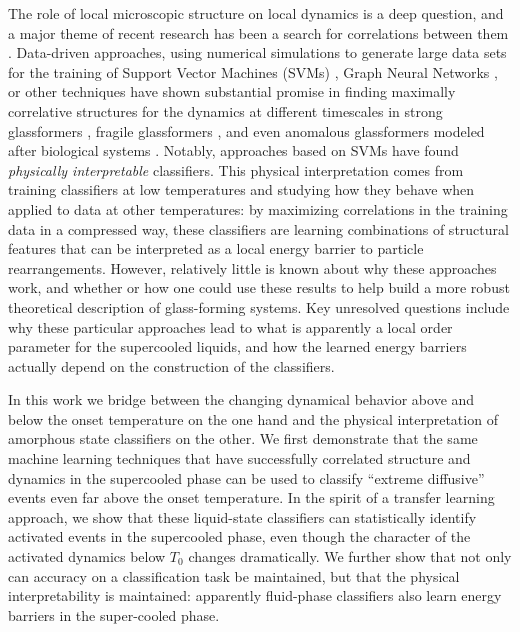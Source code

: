 \documentclass[aps,reprint,superscriptaddress,nofootinbib, notitlepage,prl]{revtex4-2}
\begin{document}
The role of local microscopic structure on local dynamics is a deep question, and a major theme of recent research has been a search for correlations between them \cite{berthier2007structure,kawasaki2007correlation, patrick2008direct,jack2014information,manning2011vibrational, widmer2008irreversible}. Data-driven approaches, using numerical simulations to generate large data sets for the training of Support Vector Machines (SVMs) \cite{cubuk2015identifying,schoenholz2016structural,sussman2017disconnecting}, Graph Neural Networks \cite{bapst2020unveiling}, or other techniques \cite{boattini2020autonomously,boattini2021averaging} have shown substantial promise in finding maximally correlative structures for the dynamics at different timescales in strong glassformers \cite{cubuk2020unifying}, fragile glassformers \cite{schoenholz2016structural,bapst2020unveiling,jung2022predicting}, and even anomalous glassformers modeled after biological systems \cite{tah2021quantifying}. Notably, approaches based on SVMs \cite{schoenholz2016structural} have found \emph{physically interpretable} classifiers. This physical interpretation comes from training classifiers at low temperatures and studying how they behave when applied to data at other temperatures: by maximizing correlations in the training data in a compressed way, these classifiers are learning combinations of structural features that can be interpreted as a local energy barrier to particle rearrangements. However, relatively little is known about why these approaches work, and whether or how one could use these results to help build a more robust theoretical description of glass-forming systems. Key unresolved questions include why these particular approaches lead to what is apparently a local order parameter for the supercooled liquids, and how the learned energy barriers actually depend on the construction of the classifiers.

In this work we bridge between the changing dynamical behavior above and below the onset temperature on the one hand and the physical interpretation of amorphous state classifiers on the other. We first demonstrate that the same machine learning techniques that have successfully correlated structure and dynamics in the supercooled phase can be used to classify ``extreme diffusive'' events even far above the onset temperature. In the spirit of a transfer learning approach, we show that these liquid-state classifiers can statistically identify activated events in the supercooled phase, even though the character of the activated dynamics below $T_0$ changes dramatically. We further show that not only can accuracy on a classification task be maintained, but that the physical interpretability is maintained: apparently fluid-phase classifiers also learn energy barriers in the super-cooled phase.
\end{document}
